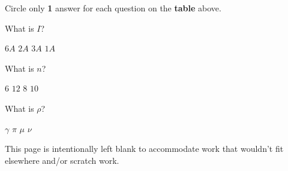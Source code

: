 \documentclass[letterpaper,12pt,addpoints]{exam}
\begin{document}
\medskip
\noindent
\begin{description}
\item Circle only \textbf{1} answer for each question on the \textbf{table} above. \\
\end{description}
\clearpage

\begin{questions}

\question What is $I$?

\begin{oneparchoices}
\choice $6A$ 
\choice $2A$
\choice $3A$ 
\CorrectChoice $1A$ 
\end{oneparchoices}

\question What is $n$?

\begin{oneparchoices}
\CorrectChoice $6$
\choice $12$ 
\choice $8$ 
\choice $10$ 
\end{oneparchoices}

\question What is $\rho$?

\begin{oneparchoices}
\choice $\gamma$
\choice $\pi$ 
\CorrectChoice $\mu$ 
\choice $\nu$ 
\end{oneparchoices}

\end{questions}

\clearpage
This page is intentionally left blank to accommodate work that wouldn't fit elsewhere and/or scratch work.
\end{document}
